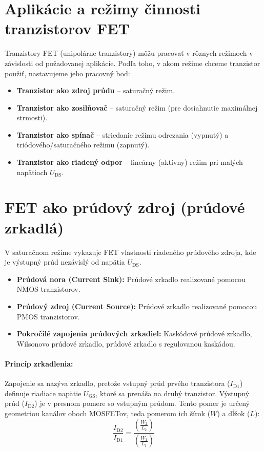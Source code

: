 \section{Aplikácie a režimy činnosti tranzistorov FET}

Tranzistory FET (unipolárne tranzistory) môžu pracovať v rôznych režimoch v závislosti od požadovanej aplikácie. Podľa toho, v akom režime chceme tranzistor použiť, nastavujeme jeho pracovný bod:
\begin{itemize}
	\item \textbf{Tranzistor ako zdroj prúdu} – saturačný režim.
	\item \textbf{Tranzistor ako zosilňovač} – saturačný režim (pre dosiahnutie maximálnej strmosti).
	\item \textbf{Tranzistor ako spínač} – striedanie režimu odrezania (vypnutý) a triódového/saturačného režimu (zapnutý).
	\item \textbf{Tranzistor ako riadený odpor} – lineárny (aktívny) režim pri malých napätiach $U_{\text{DS}}$.
\end{itemize}

\section{FET ako prúdový zdroj (prúdové zrkadlá)}
V saturačnom režime vykazuje FET vlastnosti riadeného prúdového zdroja, kde je výstupný prúd nezávislý od napätia $U_{\text{DS}}$.

\begin{itemize}
	\item \textbf{Prúdová nora (Current Sink):} Prúdové zrkadlo realizované pomocou NMOS tranzistorov.
	\item \textbf{Prúdový zdroj (Current Source):} Prúdové zrkadlo realizované pomocou PMOS tranzistorov.
	\item \textbf{Pokročilé zapojenia prúdových zrkadiel:} Kaskódové prúdové zrkadlo, Wilsonovo prúdové zrkadlo, prúdové zrkadlo s regulovanou kaskádou.
\end{itemize}

\paragraph{Princíp zrkadlenia:}
Zapojenie sa nazýva zrkadlo, pretože vstupný prúd prvého tranzistora ($I_{\text{D1}}$) definuje riadiace napätie $U_{\text{GS}}$, ktoré sa prenáša na druhý tranzistor. Výstupný prúd ($I_{\text{D2}}$) je v presnom pomere so vstupným prúdom. Tento pomer je určený geometriou kanálov oboch MOSFETov, teda pomerom ich šírok ($W$) a dĺžok ($L$):
\begin{equation}
	\frac{I_{\text{D2}}}{I_{\text{D1}}} = \frac{\left(\frac{W_2}{L_2}\right)}{\left(\frac{W_1}{L_1}\right)}
\end{equation}


